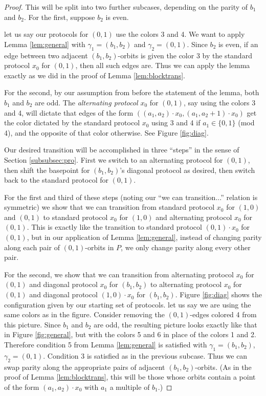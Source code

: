 \documentclass[12pt]{article}
\newcommand{\0}{\varnothing}
\begin{document}
\begin{proof}
This will be split into two further subcases, depending on the parity of $b_1$ and $b_2$. For the first, suppose $b_2$ is even.

let us say our protocols for $(0,1)$ use the colors 3 and 4. We want to apply Lemma \ref{lem:general} with $\gamma_1 = (b_1,b_2)$ and $\gamma_2 = (0,1)$. Since $b_2$ is even, if an edge between two adjacent $(b_1,b_2)$-orbits is given the color 3 by the standard protocol $x_0$ for $(0,1)$, then all such edges are. Thus we can apply the lemma exactly as we did in the proof of Lemma \ref{lem:blocktrans}.

For the second, by our assumption from before the statement of the lemma, both $b_1$ and $b_2$ are odd. The \textit{alternating protocol} $x_0$ for $(0,1)$, say using the colors 3 and 4, will dictate that edges of the form $((a_1,a_2) \cdot x_0, (a_1,a_2+1) \cdot x_0)$ get the color dictated by the standard protocol $x_0$ using 3 and 4 if $a_1 \in \{0,1\}$ (mod 4), and the opposite of that color otherwise. See Figure \ref{fig:diag}. 

Our desired transition will be accomplished in three ``steps'' in the sense of Section \ref{subsubsec:pro}. First we switch to an alternating protocol for $(0,1)$, then shift the basepoint for $(b_1,b_2)$'s diagonal protocol as desired, then switch back to the standard protocol for $(0,1)$.

For the first and third of these steps (noting our ``we can transition...'' relation is symmetric) we show that we can transition from standard protocol $x_0$ for $(1,0)$ and $(0,1)$ to standard protocol $x_0$ for $(1,0)$ and alternating protocol $x_0$ for $(0,1)$. This is exactly like the transition to standard protocol $(0,1) \cdot x_0$ for $(0,1)$, but in our application of Lemma \ref{lem:general}, instead of changing parity along each pair of $(0,1)$-orbits in $P$, we only change parity along every other pair.

For the second, we show that we can transition from alternating protocol $x_0$ for $(0,1)$ and diagonal protocol $x_0$ for $(b_1,b_2)$ to alternating protocol $x_0$ for $(0,1)$ and diagonal protocol $(1,0) \cdot x_0$ for $(b_1,b_2)$. Figure \ref{fig:diag} shows the configuration given by our starting set of protocols. let us say we are using the same colors as in the figure. Consider removing the $(0,1)$-edges colored 4 from this picture. Since $b_1$ and $b_2$ are odd, the resulting picture looks exactly like that in Figure \ref{fig:general}, but with the colors 5 and 6 in place of the colors 1 and 2. Therefore condition 5 from Lemma \ref{lem:general} is satisfied with $\gamma_1 = (b_1,b_2)$, $\gamma_2 = (0,1)$. Condition 3 is satisfied as in the previous subcase. Thus we can swap parity along the appropriate pairs of adjacent $(b_1,b_2)$-orbits. (As in the proof of Lemma \ref{lem:blocktrans}, this will be those whose orbits contain a point of the form $(a_1,a_2) \cdot x_0$ with $a_1$ a multiple of $b_1$.)
\end{proof}
\end{document}
